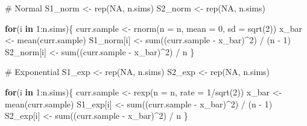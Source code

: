\documentclass[
]{article}
\newenvironment{Shaded}{\begin{snugshade}}{\end{snugshade}}
\newcommand{\AttributeTok}[1]{\textcolor[rgb]{0.40,0.45,0.13}{#1}}
\newcommand{\CommentTok}[1]{\textcolor[rgb]{0.37,0.37,0.37}{#1}}
\newcommand{\ConstantTok}[1]{\textcolor[rgb]{0.56,0.35,0.01}{#1}}
\newcommand{\ControlFlowTok}[1]{\textcolor[rgb]{0.00,0.23,0.31}{\textbf{#1}}}
\newcommand{\DecValTok}[1]{\textcolor[rgb]{0.68,0.00,0.00}{#1}}
\newcommand{\FunctionTok}[1]{\textcolor[rgb]{0.28,0.35,0.67}{#1}}
\newcommand{\NormalTok}[1]{\textcolor[rgb]{0.00,0.23,0.31}{#1}}
\newcommand{\OtherTok}[1]{\textcolor[rgb]{0.00,0.23,0.31}{#1}}
\newcommand{\SpecialCharTok}[1]{\textcolor[rgb]{0.37,0.37,0.37}{#1}}
\begin{document}
\begin{Shaded}
\begin{Highlighting}[numbers=left,,]
\CommentTok{\# Normal}
\NormalTok{S1\_norm }\OtherTok{\textless{}{-}} \FunctionTok{rep}\NormalTok{(}\ConstantTok{NA}\NormalTok{, n.sims)}
\NormalTok{S2\_norm }\OtherTok{\textless{}{-}} \FunctionTok{rep}\NormalTok{(}\ConstantTok{NA}\NormalTok{, n.sims)}

\ControlFlowTok{for}\NormalTok{(i }\ControlFlowTok{in} \DecValTok{1}\SpecialCharTok{:}\NormalTok{n.sims)\{}
\NormalTok{  curr.sample }\OtherTok{\textless{}{-}} \FunctionTok{rnorm}\NormalTok{(}\AttributeTok{n =}\NormalTok{ n, }\AttributeTok{mean =} \DecValTok{0}\NormalTok{, }\AttributeTok{sd =} \FunctionTok{sqrt}\NormalTok{(}\DecValTok{2}\NormalTok{))}
\NormalTok{  x\_bar }\OtherTok{\textless{}{-}} \FunctionTok{mean}\NormalTok{(curr.sample)}
\NormalTok{  S1\_norm[i] }\OtherTok{\textless{}{-}} \FunctionTok{sum}\NormalTok{((curr.sample }\SpecialCharTok{{-}}\NormalTok{ x\_bar)}\SpecialCharTok{\^{}}\DecValTok{2}\NormalTok{) }\SpecialCharTok{/}\NormalTok{ (n }\SpecialCharTok{{-}} \DecValTok{1}\NormalTok{)}
\NormalTok{  S2\_norm[i] }\OtherTok{\textless{}{-}} \FunctionTok{sum}\NormalTok{((curr.sample }\SpecialCharTok{{-}}\NormalTok{ x\_bar)}\SpecialCharTok{\^{}}\DecValTok{2}\NormalTok{) }\SpecialCharTok{/}\NormalTok{ n}
\NormalTok{\}}

\CommentTok{\# Exponential}
\NormalTok{S1\_exp }\OtherTok{\textless{}{-}} \FunctionTok{rep}\NormalTok{(}\ConstantTok{NA}\NormalTok{, n.sims)}
\NormalTok{S2\_exp }\OtherTok{\textless{}{-}} \FunctionTok{rep}\NormalTok{(}\ConstantTok{NA}\NormalTok{, n.sims)}

\ControlFlowTok{for}\NormalTok{(i }\ControlFlowTok{in} \DecValTok{1}\SpecialCharTok{:}\NormalTok{n.sims)\{}
\NormalTok{  curr.sample }\OtherTok{\textless{}{-}} \FunctionTok{rexp}\NormalTok{(}\AttributeTok{n =}\NormalTok{ n, }\AttributeTok{rate =} \DecValTok{1}\SpecialCharTok{/}\FunctionTok{sqrt}\NormalTok{(}\DecValTok{2}\NormalTok{))}
\NormalTok{  x\_bar }\OtherTok{\textless{}{-}} \FunctionTok{mean}\NormalTok{(curr.sample)}
\NormalTok{  S1\_exp[i] }\OtherTok{\textless{}{-}} \FunctionTok{sum}\NormalTok{((curr.sample }\SpecialCharTok{{-}}\NormalTok{ x\_bar)}\SpecialCharTok{\^{}}\DecValTok{2}\NormalTok{) }\SpecialCharTok{/}\NormalTok{ (n }\SpecialCharTok{{-}} \DecValTok{1}\NormalTok{)}
\NormalTok{  S2\_exp[i] }\OtherTok{\textless{}{-}} \FunctionTok{sum}\NormalTok{((curr.sample }\SpecialCharTok{{-}}\NormalTok{ x\_bar)}\SpecialCharTok{\^{}}\DecValTok{2}\NormalTok{) }\SpecialCharTok{/}\NormalTok{ n}
\NormalTok{\}}
\end{Highlighting}
\end{Shaded}
\end{document}
